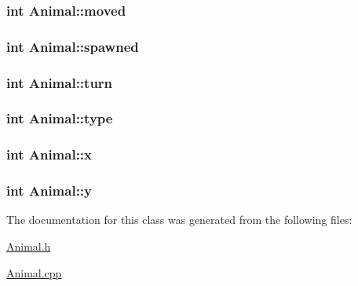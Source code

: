 \subsubsection[{\texorpdfstring{moved}{moved}}]{\setlength{\rightskip}{0pt plus 5cm}int Animal\+::moved}\hypertarget{class_animal_a3b66e4c2ad4facf254fa60319a2ef07e}{}\label{class_animal_a3b66e4c2ad4facf254fa60319a2ef07e}
\subsubsection[{\texorpdfstring{spawned}{spawned}}]{\setlength{\rightskip}{0pt plus 5cm}int Animal\+::spawned}\hypertarget{class_animal_a682c71f13c37c2d158ddeb8bbae609e0}{}\label{class_animal_a682c71f13c37c2d158ddeb8bbae609e0}
\subsubsection[{\texorpdfstring{turn}{turn}}]{\setlength{\rightskip}{0pt plus 5cm}int Animal\+::turn}\hypertarget{class_animal_a5e8202860fed2128f74d42126f33daa7}{}\label{class_animal_a5e8202860fed2128f74d42126f33daa7}
\subsubsection[{\texorpdfstring{type}{type}}]{\setlength{\rightskip}{0pt plus 5cm}int Animal\+::type}\hypertarget{class_animal_afb08c896c7ab2091765a26933e3bf034}{}\label{class_animal_afb08c896c7ab2091765a26933e3bf034}
\subsubsection[{\texorpdfstring{x}{x}}]{\setlength{\rightskip}{0pt plus 5cm}int Animal\+::x}\hypertarget{class_animal_a7bf0bfeda35cb1d9737709e9acfb5bfb}{}\label{class_animal_a7bf0bfeda35cb1d9737709e9acfb5bfb}
\subsubsection[{\texorpdfstring{y}{y}}]{\setlength{\rightskip}{0pt plus 5cm}int Animal\+::y}\hypertarget{class_animal_aecc19a45f1ab7e99a4507938f23a02da}{}\label{class_animal_aecc19a45f1ab7e99a4507938f23a02da}


The documentation for this class was generated from the following files\+:\begin{DoxyCompactItemize}
\item 
\hyperlink{_animal_8h}{Animal.\+h}\item 
\hyperlink{_animal_8cpp}{Animal.\+cpp}\end{DoxyCompactItemize}
